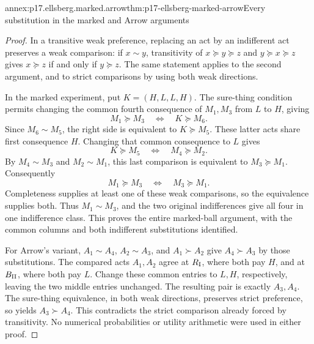 \begin{annexitem}{annex:p17.ellsberg.marked.arrow}{thm:p17-ellsberg-marked-arrow}{Every substitution in the marked and Arrow arguments}
\begin{proof}
In a transitive weak preference, replacing an act by
an indifferent act preserves a weak comparison:
if \(x\sim y\), transitivity of \(x\succeq y\succeq z\)
and \(y\succeq x\succeq z\) gives
\(x\succeq z\) if and only if \(y\succeq z\).
The same statement applies to the second argument,
and to strict comparisons by using both weak directions.

In the marked experiment, put \(K=(H,L,L,H)\).
The sure-thing condition permits changing the common
fourth consequence of \(M_1,M_3\) from \(L\) to \(H\),
giving
\[
       M_1\succeq M_3\quad\Longleftrightarrow\quad K\succeq M_6.
\]
Since \(M_6\sim M_5\), the right side is equivalent
to \(K\succeq M_5\).
These latter acts share first consequence \(H\).
Changing that common consequence to \(L\) gives
\[
                    K\succeq M_5
                         \quad\Longleftrightarrow\quad M_4\succeq M_2.
\]
By \(M_4\sim M_3\) and \(M_2\sim M_1\), this last
comparison is equivalent to \(M_3\succeq M_1\).
Consequently
\[
                   M_1\succeq M_3
                           \quad\Longleftrightarrow\quad M_3\succeq M_1.
\]
Completeness supplies at least one of these weak
comparisons, so the equivalence supplies both.
Thus \(M_1\sim M_3\), and the two original
indifferences give all four in one indifference class.
This proves the entire marked-ball argument, with
the common columns and both indifferent substitutions
identified.

For Arrow's variant, \(A_1\sim A_4\),
\(A_2\sim A_3\), and \(A_1\succ A_2\)
give \(A_4\succ A_3\) by those substitutions.
The compared acts \(A_1,A_2\) agree at
\(R_{\rm I}\), where both pay \(H\), and at
\(B_{\rm II}\), where both pay \(L\).
Change these common entries to \(L,H\), respectively,
leaving the two middle entries unchanged.
The resulting pair is exactly \(A_3,A_4\).
The sure-thing equivalence, in both weak directions,
preserves strict preference, so yields \(A_3\succ A_4\).
This contradicts the strict comparison already forced
by transitivity. No numerical probabilities or
utility arithmetic were used in either proof.
\end{proof}
\end{annexitem}

